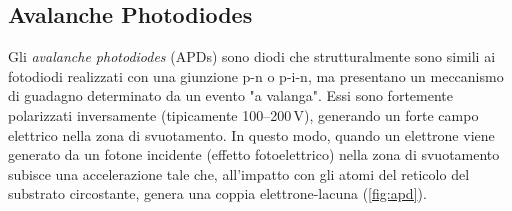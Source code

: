 \subsection{Avalanche Photodiodes}
Gli \textit{avalanche photodiodes} (APDs) sono diodi che strutturalmente sono simili ai fotodiodi realizzati con una giunzione p-n o p-i-n, ma presentano un meccanismo di guadagno determinato da un evento "a valanga". Essi sono fortemente polarizzati inversamente (tipicamente \numrange[range-phrase=--]{100}{200}\,\unit{\volt}), generando un forte campo elettrico nella zona di svuotamento. In questo modo, quando un elettrone viene generato da un fotone incidente (effetto fotoelettrico) nella zona di svuotamento subisce una accelerazione tale che, all'impatto con gli atomi del reticolo del substrato circostante, genera una coppia elettrone-lacuna (\Fig\ref{fig:apd}). 
